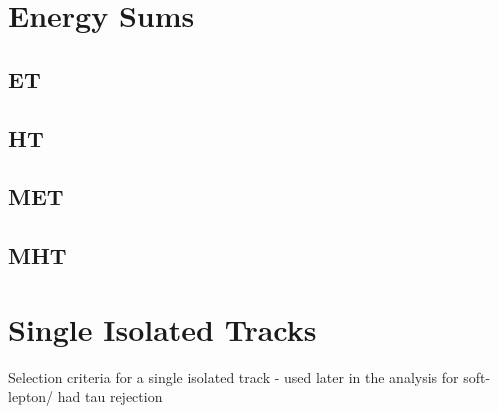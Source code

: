 \section{Energy Sums}  %
\label{sec:objects_energy_sums}

\subsection{ET}
\subsection{HT}
\subsection{MET}
\subsection{MHT}

\section{Single Isolated Tracks}  %
\label{sec:objects_sit}
Selection criteria for a single isolated track - used later in the analysis for soft-lepton/
had tau rejection